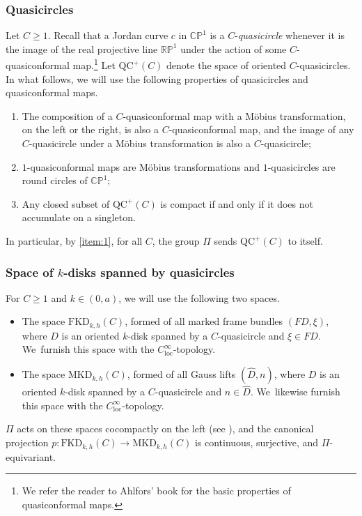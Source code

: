\documentclass[JEP,XML,SOM,Unicode,NoEqCountersInSection,published]{cedram}
\newcommand{\kdisk}{$k$\nobreakdash-disk\xspace}
\newcommand{\kdisks}{$k$\nobreakdash-disks\xspace}
\theoremstyle{plain}
\theoremstyle{definition}
\newcommand\CP{\C\PP^1}
\newcommand\RP{\R\PP^1}
\newcommand{\R}{{\mathbb R}}
\newcommand{\C}{{\mathbb C}}
\newcommand{\PP}{{\mathbb P}}
\newcommand{\loc}{\mathrm{loc}}
\newcommand{\QC}{\mathrm{QC}}
\newcommand{\MKD}{\mathrm{MKD}}
\newcommand{\FKD}{\mathrm{FKD}}
\begin{document}
\subsubsection{Quasicircles}\label{sss.PSL_quasicircles} Let $C\geq 1$. Recall that a Jordan curve $c$ in $\CP$ is a $C$\nobreakdash-\emph{quasicircle} whenever it is the image of the real projective line $\RP$ under the action of some $C$-quasiconformal map.\footnote{We refer the reader to Ahlfors' book \cite{Ahlfors} for the basic properties of quasiconformal maps.} Let $\QC^+(C)$ denote the space of oriented $C$-quasicircles. In what follows, we will use the following properties of quasicircles and quasiconformal maps.
\begin{enumerate}
\item\label{item:1} The composition of a $C$-quasiconformal map with a Möbius transformation, on the left or the right, is also a $C$-quasiconformal map, and the image of any $C$\nobreakdash-quasi\-circle under a Möbius transformation is also a $C$-quasicircle;
\item $1$-quasiconformal maps are Möbius transformations and $1$-quasicircles are round circles of $\CP$;
\item\label{item:3} Any closed subset of $\QC^+(C)$ is compact if and only if it does not accumulate on a singleton.
\end{enumerate}
In particular, by \eqref{item:1}, for all $C$, the group $\Pi$ sends $\QC^+(C)$ to itself.

\subsubsection{Space of \kdisks spanned by quasicircles}
For $C\geq 1$ and $k\in(0,a)$, we will use the following two spaces.
\begin{itemize}
\item The space $\FKD_{k,h}(C)$, formed of all marked frame bundles $(FD,\xi)$, where $D$ is an oriented \kdisk spanned by a $C$-quasicircle and $\xi\in FD$. We~furnish this space with the $C^\infty_\loc$-topology.
\item The space $\MKD_{k,h}(C)$, formed of all Gauss lifts $(\hat D,n)$, where $D$ is an oriented \kdisk spanned by a $C$-quasicircle and $n\in\hat D$. We~likewise furnish this space with the $C^\infty_\loc$-topology.
\end{itemize}
$\Pi$ acts on these spaces cocompactly on the left (see \cite{ALS,LabourieGAFA}), and the canonical projection $p:\FKD_{k,h}(C)\to\MKD_{k,h}(C)$ is continuous, surjective, and $\Pi$-equivariant.
\end{document}
